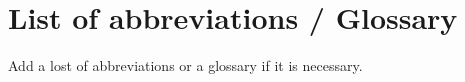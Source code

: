 \chapter*{List of abbreviations / Glossary }

Add a lost of abbreviations or a glossary if it is necessary.  